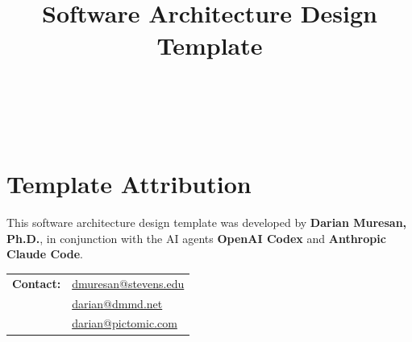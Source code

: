 \title{\ProjectName\\[0.5em]\large Software Architecture Design Template\\[1.5em]\normalsize\VERSION\\\DocumentStatus}
\author{\DocumentOwner\\\Organization}
\conferraldate{}{\DocumentDate}
\copyrightholder{\Organization}
\maketitle

\makecopyright

\cleardoublepage
{}
\chapter*{Template Attribution}

This software architecture design template was developed by
\textbf{Darian Muresan, Ph.D.}, in conjunction with the AI agents
\textbf{OpenAI Codex} and \textbf{Anthropic Claude Code}.

\begin{tabularx}{\linewidth}{@{}L{3.0cm}Y@{}}
\textbf{Contact:} & \href{mailto:dmuresan@stevens.edu}{dmuresan@stevens.edu}\\
& \href{mailto:darian@dmmd.net}{darian@dmmd.net}\\
& \href{mailto:darian@pictomic.com}{darian@pictomic.com}
\end{tabularx}

\clearpage
\begin{abstract}
  
\end{abstract}



\contentspage
\tablelistpage
\figurelistpage
